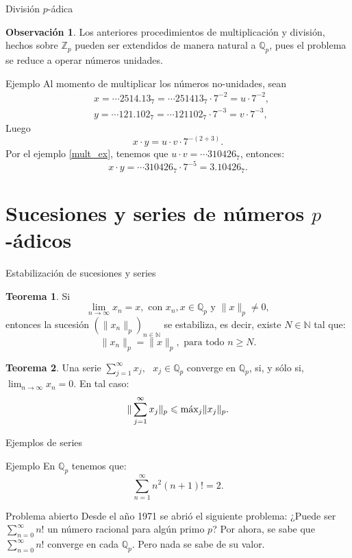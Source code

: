 \documentclass{beamer}
\newcommand{\bb}[1]{\mathbb{#1}}
\theoremstyle{definition}
\numberwithin{equation}{section}
\newcommand{\orangee}[1]{\textcolor{thColor}{#1}}
\newcommand{\redd}[1]{\textcolor{rkColor}{#1}}
\newtheorem{thh}{\orangee{Teorema}}
\newtheorem{rr}{\redd{Observación}}
\renewcommand{\geq}{\geqslant}
\renewcommand{\leq}{\leqslant}
\newcommand{\N}{\mathbb{N}}
\newcommand{\Qp}{\mathbb{Q}_p}
\newcommand{\Zp}{\mathbb{Z}_p}
\newcommand{\pnorm}[1]{\|#1\|_p}
\newcommand{\maxx}[1]{\text{m\'ax} #1}
\begin{document}
\begin{frame}{División $p$-ádica}
\begin{rr}
	Los anteriores procedimientos de multiplicación y división, hechos sobre $\Zp$ pueden ser extendidos de manera natural a $\Qp$, pues el problema se reduce a operar números unidades.
\end{rr}
\newpage
\begin{exampleblock}{Ejemplo}
	Al momento de multiplicar los números no-unidades, sean 
	\begin{align*}
	&x = \cdots2514.13_7= \cdots251413_7\cdot 7^{-2}=u\cdot 7^{-2},\\
	&y=\cdots 121.102_7=\cdots 121102_7\cdot 7^{-3}=v\cdot 7^{-3},
	\end{align*}
	Luego $$x\cdot y = u\cdot v \cdot 7^{- (2+3)}.$$
	Por el ejemplo \ref{mult_ex}, tenemos que $u\cdot v = \cdots 310426_7$, entonces:
	$$x\cdot y = \cdots 310426_7\cdot 7^{-5}=3.10426_7.$$

	
\end{exampleblock}
\end{frame}
\section{Sucesiones y series de  números $p$-ádicos}

\begin{frame}{Estabilización de sucesiones y series}
\begin{thh}
	Si $$\lim_{n\to\infty}x_n=x, \text{ con } x_n,x\in\Qp\text{ y } \pnorm{x}\neq0 ,$$
	entonces la sucesión $ (\pnorm{x_n})_{n\in\N}$ se estabiliza, es decir, existe $N\in\N$ tal que:
	$$\pnorm{x_n}=\pnorm{x}, \text{ para todo } n\geq N.$$
\end{thh}
\begin{thh}
	Una serie $\sum_{j=1}^\infty x_j, \text{   } x_j\in\Qp$ converge en $\Qp$, si, y sólo si,  $\lim_{n\to\infty}x_n=0$. En tal caso:
	$$\pnorm{\sum_{j=1}^\infty x_j}\leq \maxx_{j}\pnorm{x_j}.$$
\end{thh}
\end{frame}

\begin{frame}{Ejemplos de series}
\begin{exampleblock}{Ejemplo}
	En $\bb{Q}_p$ tenemos que: $$	\sum_{n=1}^{\infty} n^{2}  (n+1) !=2.$$ 
\end{exampleblock}
\begin{block}{Problema abierto}
	Desde el año 1971 se abrió el siguiente problema:
	¿Puede ser $\sum_{n=0}^{\infty}n!$ un número racional para algún primo $p$?
	Por ahora, se sabe que $\sum_{n=0}^{\infty}n!$ converge en cada $\Qp$. Pero nada se sabe de su valor.
\end{block}
\end{frame}
\end{document}
